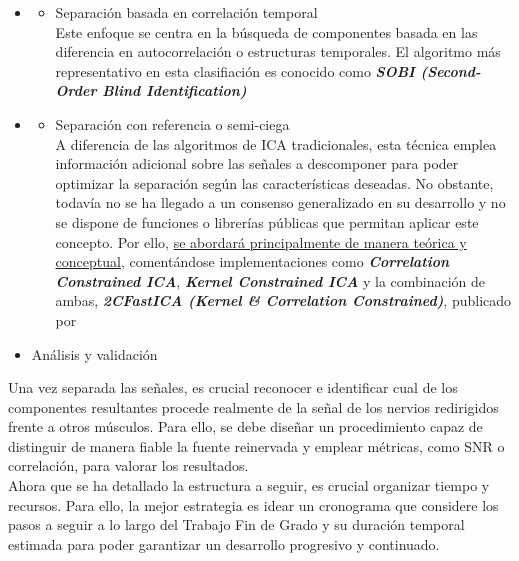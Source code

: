 \documentclass[12pt, a4paper]{article}
\begin{document}
\begin{itemize}
    \item[]
    \begin{itemize}
        \item Separación basada en correlación temporal
        \\ \noindent Este enfoque se centra en la búsqueda de componentes basada en las diferencia en autocorrelación o estructuras temporales. El algoritmo más representativo en esta clasifiación es conocido como \textbf{\textit{SOBI (Second-Order Blind Identification)}}
    \end{itemize}
\end{itemize}
\clearpage
\begin{itemize}
    \item[]
    \begin{itemize}
        \item Separación con referencia o semi-ciega
        \\ \noindent A diferencia de las algoritmos de ICA tradicionales, esta técnica emplea información adicional sobre las señales a descomponer para poder optimizar la separación según las características deseadas. No obstante, todavía no se ha llegado a un consenso generalizado en su desarrollo y no se dispone de funciones o librerías públicas que permitan aplicar este concepto. Por ello, \uline{se abordará principalmente de manera teórica y conceptual}, comentándose implementaciones como \textbf{\textit{Correlation Constrained ICA}}, \textbf{\textit{Kernel Constrained ICA}} y la combinación de ambas, \textbf{\textit{2CFastICA (Kernel \& Correlation Constrained)}}, publicado por \textbf{\textit{\cite{chen_2cfastica_2024}}}
    \end{itemize} 
\end{itemize}
\begin{itemize}
    \item Análisis y validación
\end{itemize}
Una vez separada las señales, es crucial reconocer e identificar cual de los componentes resultantes procede realmente de la señal de los nervios redirigidos frente a otros músculos. Para ello, se debe diseñar un procedimiento capaz de distinguir de manera fiable la fuente reinervada y emplear métricas, como SNR o correlación, para valorar los resultados.
\\

Ahora que se ha detallado la estructura a seguir, es crucial organizar tiempo y recursos. Para ello, la mejor estrategia es idear un cronograma que considere los pasos a seguir a lo largo del Trabajo Fin de Grado y su duración temporal estimada para poder garantizar un desarrollo progresivo y continuado. 
\end{document}
